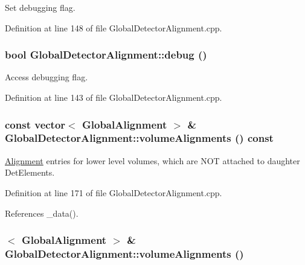 Set debugging flag. 

Definition at line 148 of file GlobalDetectorAlignment.cpp.\hypertarget{class_d_d4hep_1_1_alignments_1_1_global_detector_alignment_aeb175ec1d0dede0976111a2887c17fd6}{
\subsubsection[{debug}]{\setlength{\rightskip}{0pt plus 5cm}bool GlobalDetectorAlignment::debug ()}}
\label{class_d_d4hep_1_1_alignments_1_1_global_detector_alignment_aeb175ec1d0dede0976111a2887c17fd6}


Access debugging flag. 

Definition at line 143 of file GlobalDetectorAlignment.cpp.\hypertarget{class_d_d4hep_1_1_alignments_1_1_global_detector_alignment_a9795692b0b80e01f6cc3e35d0c953771}{
\subsubsection[{volumeAlignments}]{\setlength{\rightskip}{0pt plus 5cm}const {\bf vector}$<$ {\bf GlobalAlignment} $>$ \& GlobalDetectorAlignment::volumeAlignments () const}}
\label{class_d_d4hep_1_1_alignments_1_1_global_detector_alignment_a9795692b0b80e01f6cc3e35d0c953771}


\hyperlink{class_d_d4hep_1_1_alignments_1_1_alignment}{Alignment} entries for lower level volumes, which are NOT attached to daughter DetElements. 

Definition at line 171 of file GlobalDetectorAlignment.cpp.

References \_\-data().\hypertarget{class_d_d4hep_1_1_alignments_1_1_global_detector_alignment_aac0cf5fe586639599e736913cadf00c2}{
\subsubsection[{volumeAlignments}]{$<$ {\bf GlobalAlignment} $>$ \& GlobalDetectorAlignment::volumeAlignments ()}}
\label{class_d_d4hep_1_1_alignments_1_1_global_detector_alignment_aac0cf5fe586639599e736913cadf00c2}


